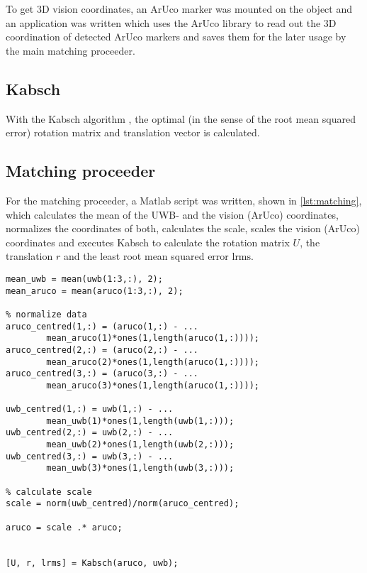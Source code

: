 To get 3D vision coordinates, an ArUco marker was mounted on the object and an application was written which uses the ArUco library to read out the 3D coordination of detected ArUco markers and saves them for the later usage by the main matching proceeder. 

\subsection{Kabsch}
With the Kabsch algorithm \cite{Kabsch:a12999}, the optimal (in the sense of the root mean squared error) rotation matrix and translation vector is calculated.

\subsection{Matching proceeder}
For the matching proceeder, a Matlab script was written, shown in \autoref{lst:matching}, which calculates the mean of the UWB- and the vision (ArUco) coordinates, normalizes the coordinates of both, calculates the scale, scales the vision (ArUco) coordinates and executes Kabsch to calculate the rotation matrix $U$, the translation $r$ and the least root mean squared error $\text{lrms}$.

\lstset{language=Matlab}
\begin{lstlisting}[frame=single, caption=Matching proceeder, label=lst:matching]
% Calculate mean
mean_uwb = mean(uwb(1:3,:), 2);
mean_aruco = mean(aruco(1:3,:), 2);
	
% normalize data	
aruco_centred(1,:) = (aruco(1,:) - ...
		mean_aruco(1)*ones(1,length(aruco(1,:))));
aruco_centred(2,:) = (aruco(2,:) - ...
		mean_aruco(2)*ones(1,length(aruco(1,:))));
aruco_centred(3,:) = (aruco(3,:) - ...
		mean_aruco(3)*ones(1,length(aruco(1,:))));

uwb_centred(1,:) = uwb(1,:) - ...
		mean_uwb(1)*ones(1,length(uwb(1,:)));
uwb_centred(2,:) = uwb(2,:) - ...
		mean_uwb(2)*ones(1,length(uwb(2,:)));
uwb_centred(3,:) = uwb(3,:) - ...
		mean_uwb(3)*ones(1,length(uwb(3,:)));
	
% calculate scale
scale = norm(uwb_centred)/norm(aruco_centred);
	
aruco = scale .* aruco;
	
	
[U, r, lrms] = Kabsch(aruco, uwb);
\end{lstlisting}
